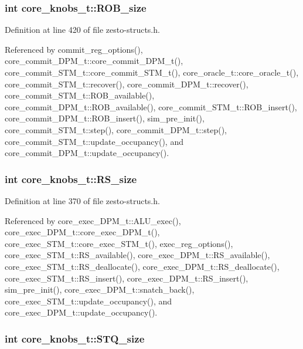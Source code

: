\subsubsection[{ROB\_\-size}]{\setlength{\rightskip}{0pt plus 5cm}int {\bf core\_\-knobs\_\-t::ROB\_\-size}}\label{structcore__knobs__t_8648564800ae0fe984ac1f418deace94}




Definition at line 420 of file zesto-structs.h.

Referenced by commit\_\-reg\_\-options(), core\_\-commit\_\-DPM\_\-t::core\_\-commit\_\-DPM\_\-t(), core\_\-commit\_\-STM\_\-t::core\_\-commit\_\-STM\_\-t(), core\_\-oracle\_\-t::core\_\-oracle\_\-t(), core\_\-commit\_\-STM\_\-t::recover(), core\_\-commit\_\-DPM\_\-t::recover(), core\_\-commit\_\-STM\_\-t::ROB\_\-available(), core\_\-commit\_\-DPM\_\-t::ROB\_\-available(), core\_\-commit\_\-STM\_\-t::ROB\_\-insert(), core\_\-commit\_\-DPM\_\-t::ROB\_\-insert(), sim\_\-pre\_\-init(), core\_\-commit\_\-STM\_\-t::step(), core\_\-commit\_\-DPM\_\-t::step(), core\_\-commit\_\-STM\_\-t::update\_\-occupancy(), and core\_\-commit\_\-DPM\_\-t::update\_\-occupancy().
\subsubsection[{RS\_\-size}]{\setlength{\rightskip}{0pt plus 5cm}int {\bf core\_\-knobs\_\-t::RS\_\-size}}\label{structcore__knobs__t_08394d4bea79adf01bdecf738a7f58f8}




Definition at line 370 of file zesto-structs.h.

Referenced by core\_\-exec\_\-DPM\_\-t::ALU\_\-exec(), core\_\-exec\_\-DPM\_\-t::core\_\-exec\_\-DPM\_\-t(), core\_\-exec\_\-STM\_\-t::core\_\-exec\_\-STM\_\-t(), exec\_\-reg\_\-options(), core\_\-exec\_\-STM\_\-t::RS\_\-available(), core\_\-exec\_\-DPM\_\-t::RS\_\-available(), core\_\-exec\_\-STM\_\-t::RS\_\-deallocate(), core\_\-exec\_\-DPM\_\-t::RS\_\-deallocate(), core\_\-exec\_\-STM\_\-t::RS\_\-insert(), core\_\-exec\_\-DPM\_\-t::RS\_\-insert(), sim\_\-pre\_\-init(), core\_\-exec\_\-DPM\_\-t::snatch\_\-back(), core\_\-exec\_\-STM\_\-t::update\_\-occupancy(), and core\_\-exec\_\-DPM\_\-t::update\_\-occupancy().
\subsubsection[{STQ\_\-size}]{\setlength{\rightskip}{0pt plus 5cm}int {\bf core\_\-knobs\_\-t::STQ\_\-size}}\label{structcore__knobs__t_0b72c6bffc51d7d9380117678e5ab22d}




